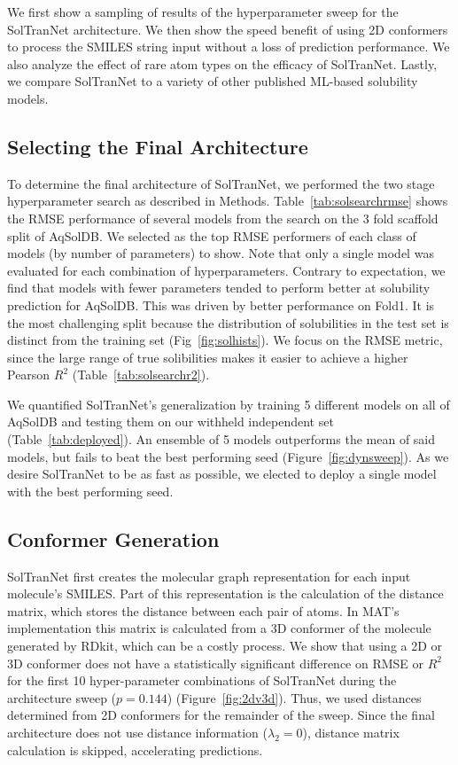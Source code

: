 \documentclass[journal=jcim,manuscript=applicationnotes]{achemso}
\begin{document}
We first show a sampling of results of the hyperparameter sweep for the SolTranNet architecture.
We then show the speed benefit of using 2D conformers to process the SMILES string input without a loss of prediction performance.
We also analyze the effect of rare atom types on the efficacy of SolTranNet.
Lastly, we compare SolTranNet to a variety of other published ML-based solubility models.

\subsection{Selecting the Final Architecture}

To determine the final architecture of SolTranNet, we performed the two stage hyperparameter search as described in Methods.
Table~\ref{tab:solsearchrmse} shows the RMSE performance of several models from the search on the 3 fold scaffold split of AqSolDB.
We selected as the top RMSE performers of each class of models (by number of parameters) to show.
Note that only a single model was evaluated for each combination of hyperparameters.
Contrary to expectation, we find that models with fewer parameters tended to perform better at solubility prediction for AqSolDB.
This was driven by better performance on Fold1.
It is the most challenging split because the distribution of solubilities in the test set is distinct from the training set (Fig~\ref{fig:solhists}).
We focus on the RMSE metric, since the large range of true solibilities makes it easier to achieve a higher Pearson $R^2$ (Table~\ref{tab:solsearchr2}).

We quantified SolTranNet's generalization by training 5 different models on all of AqSolDB and testing them on our withheld independent set (Table~\ref{tab:deployed}).
An ensemble of 5 models outperforms the mean of said models, but fails to beat the best performing seed (Figure~\ref{fig:dynsweep}).
As we desire SolTranNet to be as fast as possible, we elected to deploy a single model with the best performing seed.

\subsection{Conformer Generation}

SolTranNet first creates the molecular graph representation for each input molecule's SMILES.
Part of this representation is the calculation of the distance matrix, which stores the distance between each pair of atoms.
In MAT's implementation this matrix is calculated from a 3D conformer of the molecule generated by RDkit, which can be a costly process.
We show that using a 2D or 3D conformer does not have a statistically significant difference on RMSE or $R^2$ for the first 10 hyper-parameter combinations of SolTranNet during the architecture sweep ($p=0.144$) (Figure~\ref{fig:2dv3d}).
Thus, we used distances determined from 2D conformers for the remainder of the sweep. 
Since the final architecture does not use distance information ($\lambda_2 = 0$), distance matrix calculation is skipped, accelerating predictions.
\end{document}
